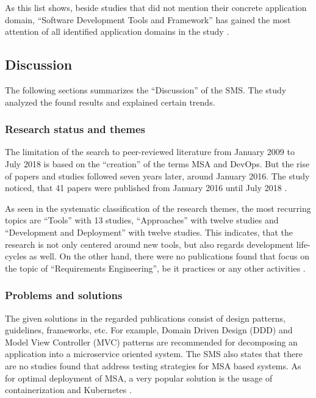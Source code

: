 As this list shows, beside studies that did not mention their concrete
application domain, ``Software Development Tools and Framework''
has gained the most attention of all identified application domains
in the study \cite{waseem:SMSMSADevOps}.

\subsection{Discussion}

The following sections summarizes the ``Discussion'' of the SMS. The study
analyzed the found results and explained certain trends.

\subsubsection{Research status and themes}

The limitation of the search to peer-reviewed literature from January 2009 to
July 2018 is based on the ``creation'' of the terms MSA and DevOps.
But the rise of papers and studies followed seven years later, around January 2016.
The study noticed, that 41 papers were published from January 2016 until July 2018
\cite{waseem:SMSMSADevOps}.

As seen in the systematic classification of the research themes, the most recurring
topics are ``Tools'' with 13 studies, ``Approaches'' with twelve studies and
``Development and Deployment'' with twelve studies. This indicates, that the research
is not only centered around new tools, but also regards development life-cycles
as well. On the other hand, there were no publications found that focus on
the topic of ``Requirements Engineering'', be it practices or any other
activities \cite{waseem:SMSMSADevOps}.

\subsubsection{Problems and solutions}

The given solutions in the regarded publications consist of
design patterns, guidelines, frameworks, etc. For example,
Domain Driven Design (DDD) and Model View Controller (MVC) patterns
are recommended for decomposing an application into a microservice oriented
system. The SMS also states that there are no studies found that
address testing strategies for MSA based systems. As for optimal deployment
of MSA, a very popular solution is the usage of containerization and Kubernetes
\cite{waseem:SMSMSADevOps}.

